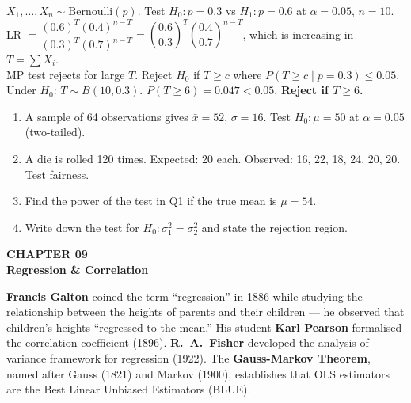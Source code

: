 \documentclass[12pt]{article}
\begin{document}
\begin{examplebox}
$X_1,\ldots,X_n\sim\text{Bernoulli}(p)$. Test $H_0:p=0.3$ vs $H_1:p=0.6$ at $\alpha=0.05$, $n=10$.\\[4pt]
LR $=\dfrac{(0.6)^T(0.4)^{n-T}}{(0.3)^T(0.7)^{n-T}}=\left(\dfrac{0.6}{0.3}\right)^T\!\left(\dfrac{0.4}{0.7}\right)^{n-T}$, which is increasing in $T=\sum X_i$.\\[4pt]
MP test rejects for large $T$. Reject $H_0$ if $T\geq c$ where $P(T\geq c\mid p=0.3)\leq0.05$.\\
Under $H_0$: $T\sim B(10,0.3)$. $P(T\geq6)=0.047<0.05$. \textbf{Reject if $T\geq6$.}
\end{examplebox}

\begin{practicebox}
\begin{enumerate}[label=\textbf{Q\arabic*.},noitemsep]
  \item A sample of 64 observations gives $\bar x=52$, $\sigma=16$. Test $H_0:\mu=50$ at $\alpha=0.05$ (two-tailed).
  \item A die is rolled 120 times. Expected: 20 each. Observed: 16, 22, 18, 24, 20, 20. Test fairness.
  \item Find the power of the test in Q1 if the true mean is $\mu=54$.
  \item Write down the test for $H_0:\sigma_1^2=\sigma_2^2$ and state the rejection region.
\end{enumerate}
\end{practicebox}

\newpage

\begin{tcolorbox}[enhanced,arc=0pt,boxrule=0pt,colback=primary,colframe=primary,
  left=16pt,right=16pt,top=14pt,bottom=10pt,borderline south={4pt}{0pt}{accent}]
  {\color{accent!70}\small\bfseries CHAPTER 09}\\[4pt]
  {\LARGE\bfseries\color{white}Regression \& Correlation}
\end{tcolorbox}
\vspace{10pt}

\begin{histbox}
\textbf{Francis Galton} coined the term ``regression'' in 1886 while studying the relationship between the heights of parents and their children --- he observed that children's heights ``regressed to the mean.'' His student \textbf{Karl Pearson} formalised the correlation coefficient (1896). \textbf{R.\ A.\ Fisher} developed the analysis of variance framework for regression (1922). The \textbf{Gauss-Markov Theorem}, named after Gauss (1821) and Markov (1900), establishes that OLS estimators are the Best Linear Unbiased Estimators (BLUE).
\end{histbox}
\end{document}
